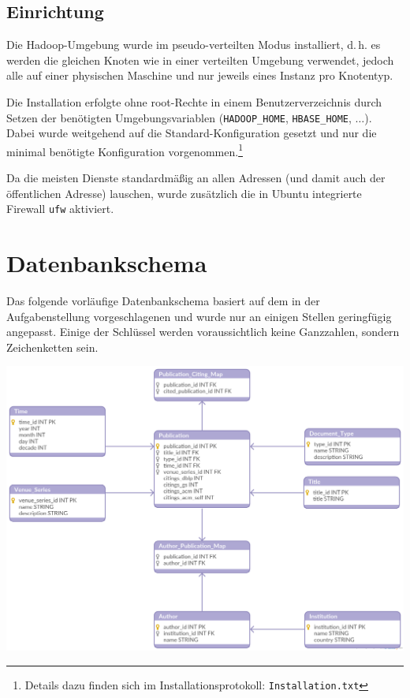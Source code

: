 \documentclass[a4paper,11pt,utf8]{scrartcl}
\begin{document}
\subsection{Einrichtung}

Die Hadoop-Umgebung wurde im pseudo-verteilten Modus installiert, d.\,h. es werden die gleichen Knoten wie in einer verteilten Umgebung verwendet, jedoch alle auf einer physischen Maschine und nur jeweils eines Instanz pro Knotentyp.

Die Installation erfolgte ohne root-Rechte in einem Benutzerverzeichnis durch Setzen der benötigten Umgebungsvariablen (\texttt{HADOOP\_HOME}, \texttt{HBASE\_HOME}, $\dots$). Dabei wurde weitgehend auf die Standard-Konfiguration gesetzt und nur die minimal benötigte Konfiguration vorgenommen.\footnote{Details dazu finden sich im Installationsprotokoll: \texttt{Installation.txt}}

Da die meisten Dienste standardmäßig an allen Adressen (und damit auch der öffentlichen Adresse) lauschen, wurde zusätzlich die in Ubuntu integrierte Firewall \texttt{ufw} aktiviert.

\section{Datenbankschema}

Das folgende vorläufige Datenbankschema basiert auf dem in der Aufgabenstellung vorgeschlagenen und wurde nur an einigen Stellen geringfügig angepasst. Einige der Schlüssel werden voraussichtlich keine Ganzzahlen, sondern Zeichenketten sein.

\noindent
\includegraphics[width=\textwidth]{schema.png}
\end{document}
